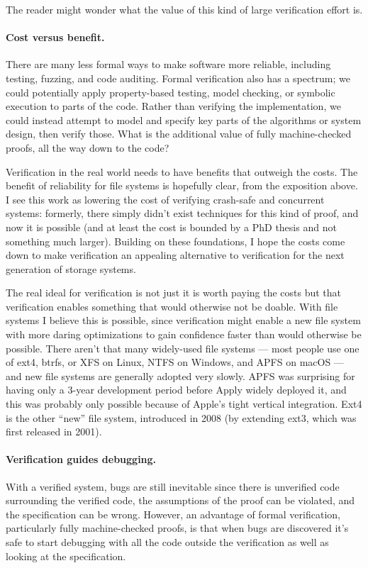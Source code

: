 The reader might wonder what the value of this kind of large verification effort
is.

\paragraph{Cost versus benefit.} There are many less formal ways to make
software more reliable, including testing, fuzzing, and code auditing. Formal
verification also has a spectrum; we could potentially apply property-based
testing, model checking, or symbolic execution to parts of the code. Rather than
verifying the implementation, we could instead attempt to model and specify key
parts of the algorithms or system design, then verify those. What is the
additional value of fully machine-checked proofs, all the way down to the code?

Verification in the real world needs to have benefits that outweigh the costs.
The benefit of reliability for file systems is hopefully clear, from the
exposition above. I see this work as lowering the cost of verifying crash-safe
and concurrent systems: formerly, there simply didn't exist techniques for this
kind of proof, and now it is possible (and at least the cost is bounded by a PhD
thesis and not something much larger). Building on these foundations, I hope the
costs come down to make verification an appealing alternative to verification
for the next generation of storage systems.

The real ideal for verification is not just it is worth paying the costs but
that verification enables something that would otherwise not be doable. With
file systems I believe this is possible, since verification might enable a new
file system with more daring optimizations to gain confidence faster than would
otherwise be possible. There aren't that many widely-used file systems --- most
people use one of ext4, btrfs, or XFS on Linux, NTFS on Windows, and APFS on
macOS --- and new file systems are generally adopted very slowly. APFS was
surprising for having only a 3-year development period before Apply widely
deployed it, and this was probably only possible because of Apple's tight
vertical integration. Ext4 is the other ``new'' file system, introduced in 2008
(by extending ext3, which was first released in 2001).


\paragraph{Verification guides debugging.} With a verified system, bugs are
still inevitable since there is unverified code surrounding the verified code,
the assumptions of the proof can be violated, and the specification can be
wrong. However, an advantage of formal verification, particularly fully
machine-checked proofs, is that when bugs are discovered it's safe to start
debugging with all the code outside the verification as well as looking at the
specification.

